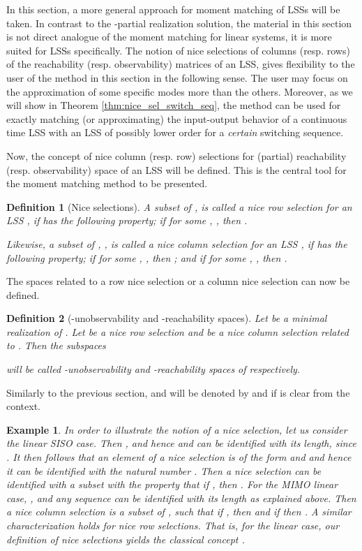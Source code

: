 \documentclass[journal]{IEEEtran}
\newtheorem{Definition}{Definition}
\newtheorem{Example}{Example}
\begin{document}
In this section, a more general approach for moment matching of LSSs will be taken. In contrast to the -partial realization solution, the material in this section is not direct analogue of the moment matching for linear systems, it is more suited for LSSs specifically. The notion of nice selections of columns (resp. rows) of the reachability (resp. observability) matrices of an LSS, gives flexibility to the user of the method in this section in the following sense. The user may focus on the approximation of some specific modes more than the others. Moreover, as we will show in Theorem \ref{thm:nice_sel_switch_seq}, the method can be used for exactly matching (or approximating) the input-output behavior of a continuous time LSS with an LSS of possibly lower order for a \emph{certain} switching sequence.


Now, the concept of nice column (resp. row) selections for (partial) reachability (resp. observability) space of an LSS will be defined. This is the central tool for the moment matching method to be presented. 

\begin{Definition}[Nice selections]
	A subset  of ,  is called a nice row selection for an LSS , if  has the following property; if  for some , , then .
	
	Likewise, a subset  of , , is called a nice column selection for an LSS  , if  has the following property; if  for some , , then ; and if  for some , , then .
\end{Definition}

The spaces related to a row nice selection  or a column nice selection  can now be defined.
 
\begin{Definition}[-unobservability and -reachability spaces]
Let   be a minimal realization of . Let  be a nice row selection and  be a nice column selection related to . Then the subspaces

will be called -unobservability and -reachability spaces of  respectively.
\end{Definition}
Similarly to the previous section,  and  will be denoted by  and  if  is clear from the context. 

\begin{Example} \label{ex:nice_sel1}
	In order to illustrate the notion of a nice selection, let us consider the linear SISO case. Then , and hence  and  can be identified with its length, since . It then follows that an element  of a nice selection is of the form  and  and hence it can be identified with the natural number . Then a nice selection  can be identified with a subset  with the property that if , then . For the MIMO linear case, , and any sequence  can be identified with its length as explained above. Then a nice column selection  is a subset of , such that if , then  and if  then . A similar characterization holds for nice row selections. That is, for the linear case, our definition of nice selections yields the classical concept \cite{Hazewinkel1}.
\end{Example}
\end{document}

